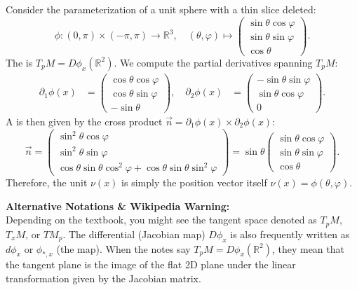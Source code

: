 \begin{example} %
Consider the parameterization of a unit sphere with a thin slice deleted: %
\[
\phi : (0, \pi) \times (-\pi, \pi) \to \mathbb{R}^3, \quad (\theta, \varphi) \mapsto 
\begin{pmatrix}
\sin\theta \cos\varphi \\
\sin\theta \sin\varphi \\
\cos\theta
\end{pmatrix}. %
\]
The  is $T_pM = D\phi_x(\mathbb{R}^2)$. We compute the partial derivatives spanning $T_pM$: %
\begin{align*}
\partial_1\phi(x) &= 
\begin{pmatrix}
\cos\theta \cos\varphi \\
\cos\theta \sin\varphi \\
-\sin\theta
\end{pmatrix}, \quad
\partial_2\phi(x) &= 
\begin{pmatrix}
-\sin\theta \sin\varphi \\
\sin\theta \cos\varphi \\
0
\end{pmatrix}. %
\end{align*}
A  is then given by the cross product $\vec{n} = \partial_1\phi(x) \times \partial_2\phi(x)$: %
\[
\vec{n} = 
\begin{pmatrix}
\sin^2\theta \cos\varphi \\
\sin^2\theta \sin\varphi \\
\cos\theta\sin\theta\cos^2\varphi + \cos\theta\sin\theta\sin^2\varphi
\end{pmatrix} 
= \sin\theta 
\begin{pmatrix}
\sin\theta \cos\varphi \\
\sin\theta \sin\varphi \\
\cos\theta
\end{pmatrix}. %
\]
Therefore, the unit  $\nu(x)$ is simply the position vector itself $\nu(x) = \phi(\theta, \varphi)$.
\end{example}

\begin{extra}
\textbf{Alternative Notations \& Wikipedia Warning:} \\
Depending on the textbook, you might see the tangent space denoted as $T_pM$, $T_xM$, or $TM_p$. The differential (Jacobian map) $D\phi_x$ is also frequently written as $d\phi_x$ or $\phi_{*, x}$ (the  map). When the notes say $T_p M = D\phi_x(\mathbb{R}^2)$, they mean that the tangent plane is the image of the flat 2D plane under the linear transformation given by the Jacobian matrix.
\end{extra}

